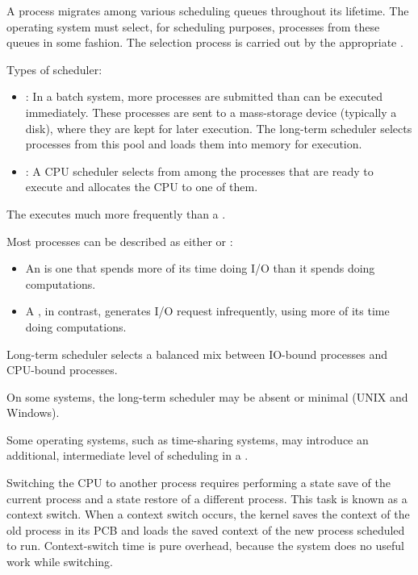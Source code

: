       \par A process migrates among various scheduling queues throughout its
        lifetime. The operating system must select, for scheduling purposes,
        processes from these queues in some fashion. The selection process is
        carried out by the appropriate .
      \par Types of scheduler:
      \begin{itemize}
        \item {}: In a batch system, more processes are submitted than can be executed immediately. These processes are sent to a mass-storage device (typically a disk), where they are kept for later execution. The long-term scheduler selects processes from this pool and loads them into memory for execution.
        \item {}: A CPU scheduler selects from among the processes that are ready to execute and allocates the CPU to one of them.
      \end{itemize}
      \par The  executes much more frequently than a .

      \par Most processes can be described as either  or :
      \begin{itemize}
        \item An  is one that spends more of its time
          doing I/O than it spends doing computations.
        \item A , in contrast, generates I/O request
          infrequently, using more of its time doing computations.
      \end{itemize}
      \par Long-term scheduler selects a balanced mix between IO-bound processes and CPU-bound processes.
      \par On some systems, the long-term scheduler may be absent or minimal (UNIX and Windows).
      \par Some operating systems, such as time-sharing systems, may introduce an additional, intermediate level of scheduling in a .

    \par Switching the CPU to another process requires performing a state save of the current process and a state restore of a different process. This task is known as a context switch. When a context switch occurs, the kernel saves the context of the old process in its PCB and loads the saved context of the new process scheduled to run. Context-switch time is pure overhead, because the system does no useful work while switching.


